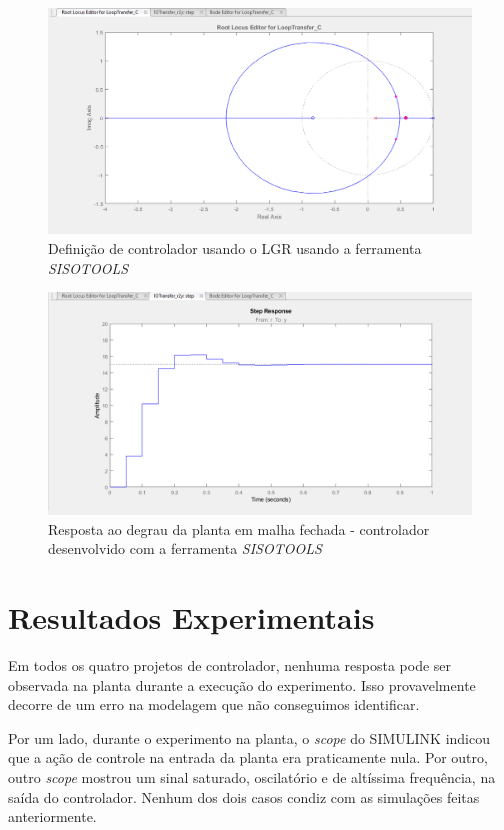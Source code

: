 \documentclass{article}
\begin{document}
\begin{figure}[H]
    \centering
        \includegraphics[width=.8\linewidth]{images/Matlab/SISOTOOLS-LGR.PNG}
        \caption{Definição de controlador usando o LGR usando a ferramenta \textit{SISOTOOLS}}\label{fig:SISOTOOLS-LGR}
\end{figure}

\begin{figure}[H]
    \centering
        \includegraphics[width=.8\linewidth]{images/Matlab/SISOTOOLS-STEP.PNG}
        \caption{Resposta ao degrau da planta em malha fechada - controlador desenvolvido com a ferramenta  \textit{SISOTOOLS}}\label{fig:SISOTOOLS-STEP}
\end{figure}

\clearpage

\section{Resultados Experimentais}

Em todos os quatro projetos de controlador, nenhuma resposta pode ser observada na planta durante a execução do experimento. Isso provavelmente decorre de um erro na modelagem que não conseguimos identificar.

Por um lado, durante o experimento na planta, o \textit{scope} do SIMULINK indicou que a ação de controle na entrada da planta era praticamente nula. Por outro, outro \textit{scope} mostrou um sinal saturado, oscilatório e de altíssima frequência, na saída do controlador. Nenhum dos dois casos condiz com as simulações feitas anteriormente.
\end{document}
